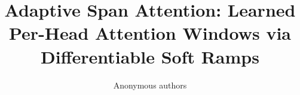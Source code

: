 \title{\textbf{Adaptive Span Attention: Learned Per-Head Attention Windows via Differentiable Soft Ramps}}

\author{Anonymous authors}
